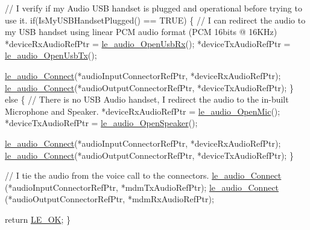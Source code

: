 \begin{DoxyCode}
    \textcolor{comment}{// I verify if my Audio USB handset is plugged and operational before trying to use it.}
    \textcolor{keywordflow}{if}(IsMyUSBHandsetPlugged() == TRUE)
    \{
        \textcolor{comment}{// I can redirect the audio to my USB handset using linear PCM audio format (PCM 16bits @ 16KHz)}
        *deviceRxAudioRefPtr = \hyperlink{le__audio__interface_8h_acd8be89289067cef9441a8ed1d891146}{le\_audio\_OpenUsbRx}();
        *deviceTxAudioRefPtr = \hyperlink{le__audio__interface_8h_adb38f11ac78cf99160c19f69b4db0eb8}{le\_audio\_OpenUsbTx}();

        \hyperlink{le__audio__interface_8h_a338df65b2fb1ae0140d86880adbcf0de}{le\_audio\_Connect}(*audioInputConnectorRefPtr, *deviceRxAudioRefPtr);
        \hyperlink{le__audio__interface_8h_a338df65b2fb1ae0140d86880adbcf0de}{le\_audio\_Connect}(*audioOutputConnectorRefPtr, *deviceTxAudioRefPtr);
    \}
    \textcolor{keywordflow}{else}
    \{
        \textcolor{comment}{// There is no USB Audio handset, I redirect the audio to the in-built Microphone and Speaker.}
        *deviceRxAudioRefPtr = \hyperlink{le__audio__interface_8h_a74f1ef979329f6c2bd56ea622f4d05b2}{le\_audio\_OpenMic}();
        *deviceTxAudioRefPtr = \hyperlink{le__audio__interface_8h_a5c19afce44021c4abf6193707317f8de}{le\_audio\_OpenSpeaker}();

        \hyperlink{le__audio__interface_8h_a338df65b2fb1ae0140d86880adbcf0de}{le\_audio\_Connect}(*audioInputConnectorRefPtr, *deviceRxAudioRefPtr);
        \hyperlink{le__audio__interface_8h_a338df65b2fb1ae0140d86880adbcf0de}{le\_audio\_Connect}(*audioOutputConnectorRefPtr, *deviceTxAudioRefPtr);
    \}

    \textcolor{comment}{// I tie the audio from the voice call to the connectors.}
    \hyperlink{le__audio__interface_8h_a338df65b2fb1ae0140d86880adbcf0de}{le\_audio\_Connect} (*audioInputConnectorRefPtr, *mdmTxAudioRefPtr);
    \hyperlink{le__audio__interface_8h_a338df65b2fb1ae0140d86880adbcf0de}{le\_audio\_Connect} (*audioOutputConnectorRefPtr, *mdmRxAudioRefPtr);

    \textcolor{keywordflow}{return} \hyperlink{le__basics_8h_a1cca095ed6ebab24b57a636382a6c86ca5066a4bcec691c6b67843b8f79656422}{LE\_OK};
\}



\end{DoxyCode}
